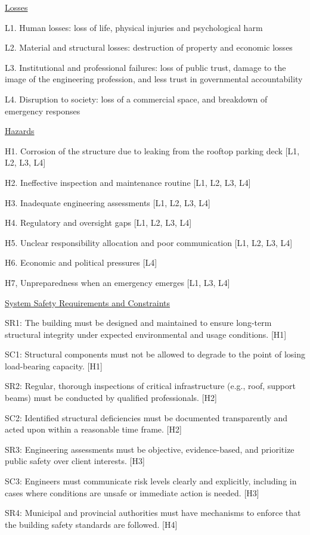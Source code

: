 \documentclass[12pt]{article}
\begin{document}
\underline{Losses}

L1. Human losses: loss of life, physical injuries and psychological harm

L2. Material and structural losses: destruction of property and economic losses

L3. Institutional and professional failures: loss of public trust, damage to the image of the engineering profession, and less trust in governmental accountability

L4. Disruption to society: loss of a commercial space, and breakdown of emergency responses

\underline{Hazards}

H1. Corrosion of the structure due to leaking from the rooftop parking deck [L1, L2, L3, L4]

H2. Ineffective inspection and maintenance routine [L1, L2, L3, L4]

H3. Inadequate engineering assessments [L1, L2, L3, L4]

H4. Regulatory and oversight gaps [L1, L2, L3, L4]

H5. Unclear responsibility allocation and poor communication [L1, L2, L3, L4]

H6. Economic and political pressures [L4]

H7, Unpreparedness when an emergency emerges [L1, L3, L4]

\underline{System Safety Requirements and Constraints}

SR1: The building must be designed and maintained to ensure long-term structural integrity under expected environmental and usage conditions. [H1]

SC1: Structural components must not be allowed to degrade to the point of losing load-bearing capacity. [H1]

SR2: Regular, thorough inspections of critical infrastructure (e.g., roof, support beams) must be conducted by qualified professionals. [H2]

SC2: Identified structural deficiencies must be documented transparently and acted upon within a reasonable time frame. [H2]

SR3: Engineering assessments must be objective, evidence-based, and prioritize public safety over client interests. [H3]

SC3: Engineers must communicate risk levels clearly and explicitly, including in cases where conditions are unsafe or immediate action is needed. [H3]

SR4: Municipal and provincial authorities must have mechanisms to enforce that the building safety standards are followed. [H4]
\end{document}
